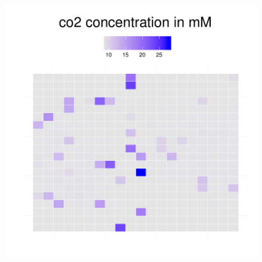 \begin{figure}[h!]
{\begin{minipage}[t]{0.3\textwidth}
  \end{minipage}
  \begin{minipage}[t]{0.3\textwidth}
    \includegraphics[width=\textwidth]{../results/barkeri_20x20_seed9659_co2130.pdf}
  \end{minipage}
  }
\end{figure}
